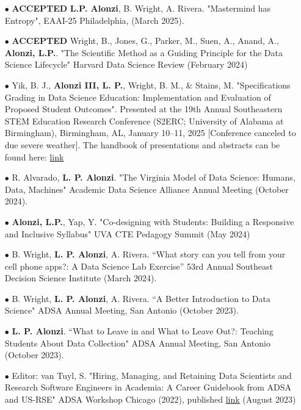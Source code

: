\documentclass{article}[10pt]
\begin{document}
\begin{itemize}


\item [$\bullet$] {\bf ACCEPTED} {\bf L.P. Alonzi}, B. Wright, A. Rivera. "Mastermind has Entropy", EAAI-25 Philadelphia, (March 2025).

\item [$\bullet$] {\bf ACCEPTED} Wright, B., Jones, G., Parker, M., Suen, A., Anand, A., {\bf Alonzi, L.P.}. "The Scientific Method as a Guiding Principle for the Data Science Lifecycle" Harvard Data Science Review (February 2024)

\item[$\bullet$] Yik, B. J., {\bf Alonzi III, L. P.}, Wright, B. M., \& Stains, M. "Specifications Grading in Data Science Education: Implementation and Evaluation of Proposed Student Outcomes". Presented at the 19th Annual Southeastern STEM Education Research Conference (S2ERC; University of Alabama at Birmingham), Birmingham, AL, January 10–11, 2025 [Conference canceled to due severe weather]. The handbook of presentations and abstracts can be found here: \href{https://tsec.mtsu.edu/wp-content/uploads/sites/67/2025/01/SSERC-2025-Program-Abstracts-1.pdf}{link}

\item [$\bullet$] R. Alvarado, {\bf L. P. Alonzi}. "The Virginia Model of Data Science: Humans, Data, Machines" Academic Data Science Alliance Annual Meeting (October 2024). 

\item [$\bullet$] {\bf Alonzi, L.P.}, Yap, Y. "Co-designing with Students: Building a Responsive and Inclusive Syllabus" UVA CTE Pedagogy Summit (May 2024)

\item [$\bullet$] B. Wright, {\bf L. P. Alonzi}, A. Rivera. “What story can you tell from your cell phone apps?: A Data Science Lab Exercise” 53rd Annual Southeast Decision Science Institute (March 2024).

\item [$\bullet$] B. Wright, {\bf L. P. Alonzi}, A. Rivera. “A Better Introduction to Data Science" ADSA Annual Meeting, San Antonio (October 2023).

\item [$\bullet$] {\bf L. P. Alonzi}. “What to Leave in and What to Leave Out?: Teaching Students About Data Collection" ADSA Annual Meeting, San Antonio (October 2023).

\item [$\bullet$] Editor: van Tuyl, S. "Hiring, Managing, and Retaining Data Scientists and Research Software Engineers in Academia: A Career Guidebook from ADSA and US-RSE" ADSA Workshop Chicago (2022), published \href{https://zenodo.org/records/8329337}{link} (August 2023)


\end{itemize}
\end{document}
